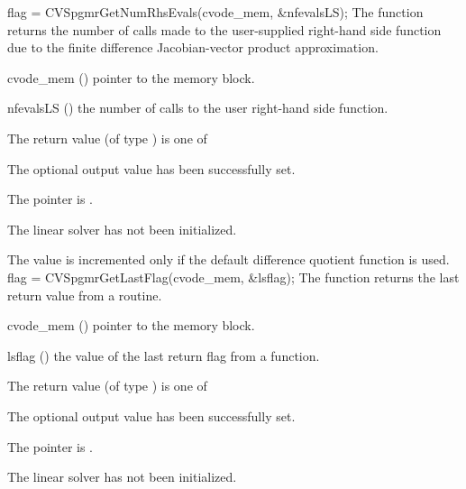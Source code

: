 {}
{
  flag = CVSpgmrGetNumRhsEvals(cvode\_mem, \&nfevalsLS);
}
{
  The function  returns the
  number of calls made to the user-supplied right-hand side function due to the
  finite difference Jacobian-vector product approximation.
}
{
  \begin{args}
  \item[cvode\_mem] ()
    pointer to the {\cvodes} memory block.
  \item[nfevalsLS] ()
    the number of calls to the user right-hand side function.
  \end{args}
}
{
  The return value  (of type ) is one of
  \begin{args}
  \item[\Id{CVSPGMR\_SUCCESS}] 
    The optional output value has been successfully set.
  \item[\Id{CVSPGMR\_MEM\_NULL}]
    The  pointer is .
  \item[\Id{CVSPGMR\_LMEM\_NULL}]
    The {\cvspgmr} linear solver has not been initialized.
  \end{args}
}
{
  The value  is incremented only if the default 
   difference quotient function is used.
}
{
  flag = CVSpgmrGetLastFlag(cvode\_mem, \&lsflag);
}
{
  The function  returns the
  last return value from a {\cvspgmr} routine. 
}
{
  \begin{args}
  \item[cvode\_mem] ()
    pointer to the {\cvodes} memory block.
  \item[lsflag] ()
    the value of the last return flag from a {\cvspgmr} function.
  \end{args}
}
{
  The return value  (of type ) is one of
  \begin{args}
  \item[\Id{CVSPGMR\_SUCCESS}] 
    The optional output value has been successfully set.
  \item[\Id{CVSPGMR\_MEM\_NULL}]
    The  pointer is .
  \item[\Id{CVSPGMR\_LMEM\_NULL}]
    The {\cvspgmr} linear solver has not been initialized.
  \end{args}
}
